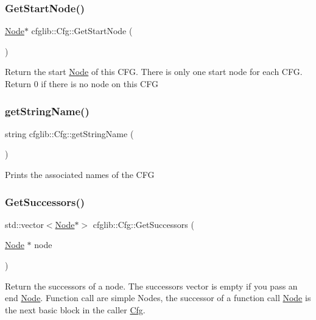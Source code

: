 \subsubsection{\texorpdfstring{Get\+Start\+Node()}{GetStartNode()}}
{\footnotesize\ttfamily \hyperlink{classcfglib_1_1Node}{Node}$\ast$ cfglib\+::\+Cfg\+::\+Get\+Start\+Node (\begin{DoxyParamCaption}{ }\end{DoxyParamCaption})}

Return the start \hyperlink{classcfglib_1_1Node}{Node} of this C\+FG. There is only one start node for each C\+FG. Return 0 if there is no node on this C\+FG \mbox{\label{classcfglib_1_1Cfg_ae9317f335c39263f55484b0149725d4c}} 
\subsubsection{\texorpdfstring{get\+String\+Name()}{getStringName()}}
{\footnotesize\ttfamily string cfglib\+::\+Cfg\+::get\+String\+Name (\begin{DoxyParamCaption}{ }\end{DoxyParamCaption})}

Prints the associated names of the C\+FG \mbox{\label{classcfglib_1_1Cfg_a4f52a0e3814e4d404d5520437d27d407}} 
\subsubsection{\texorpdfstring{Get\+Successors()}{GetSuccessors()}}
{\footnotesize\ttfamily std\+::vector$<$\hyperlink{classcfglib_1_1Node}{Node}$\ast$$>$ cfglib\+::\+Cfg\+::\+Get\+Successors (\begin{DoxyParamCaption}\item[{\hyperlink{classcfglib_1_1Node}{Node} $\ast$}]{node }\end{DoxyParamCaption})}

Return the successors of a node. The successors vector is empty if you pass an end \hyperlink{classcfglib_1_1Node}{Node}. Function call are simple Nodes, the successor of a function call \hyperlink{classcfglib_1_1Node}{Node} is the next basic block in the caller \hyperlink{classcfglib_1_1Cfg}{Cfg}. \mbox{\label{classcfglib_1_1Cfg_aaf238d539a151d6087a9381f5a89555e}} 
